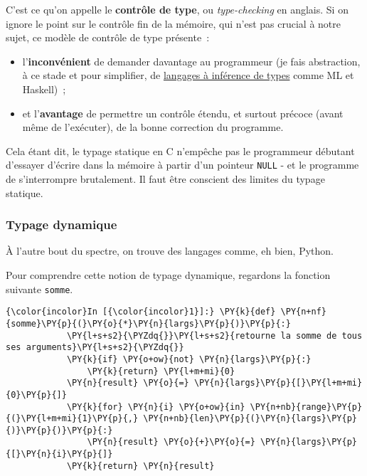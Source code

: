     C'est ce qu'on appelle le \textbf{contrôle de type}, ou
\emph{type-checking} en anglais. Si on ignore le point sur le contrôle
fin de la mémoire, qui n'est pas crucial à notre sujet, ce modèle de
contrôle de type présente~:

\begin{itemize}
\tightlist
\item
  l'\textbf{inconvénient} de demander davantage au programmeur (je fais
  abstraction, à ce stade et pour simplifier, de
  \href{https://en.wikipedia.org/wiki/Type_inference}{langages à
  inférence de types} comme ML et Haskell)~;
\item
  et l'\textbf{avantage} de permettre un contrôle étendu, et surtout
  précoce (avant même de l'exécuter), de la bonne correction du
  programme.
\end{itemize}

    Cela étant dit, le typage statique en C n'empêche pas le programmeur
débutant d'essayer d'écrire dans la mémoire à partir d'un pointeur
\texttt{NULL} - et le programme de s'interrompre brutalement. Il faut
être conscient des limites du typage statique.

    \hypertarget{typage-dynamique}{%
\subsubsection{Typage dynamique}\label{typage-dynamique}}

    À l'autre bout du spectre, on trouve des langages comme, eh bien,
Python.

    Pour comprendre cette notion de typage dynamique, regardons la fonction
suivante \texttt{somme}.

    \begin{Verbatim}[commandchars=\\\{\}]
{\color{incolor}In [{\color{incolor}1}]:} \PY{k}{def} \PY{n+nf}{somme}\PY{p}{(}\PY{o}{*}\PY{n}{largs}\PY{p}{)}\PY{p}{:}
            \PY{l+s+s2}{\PYZdq{}}\PY{l+s+s2}{retourne la somme de tous ses arguments}\PY{l+s+s2}{\PYZdq{}}
            \PY{k}{if} \PY{o+ow}{not} \PY{n}{largs}\PY{p}{:}
                \PY{k}{return} \PY{l+m+mi}{0}
            \PY{n}{result} \PY{o}{=} \PY{n}{largs}\PY{p}{[}\PY{l+m+mi}{0}\PY{p}{]}
            \PY{k}{for} \PY{n}{i} \PY{o+ow}{in} \PY{n+nb}{range}\PY{p}{(}\PY{l+m+mi}{1}\PY{p}{,} \PY{n+nb}{len}\PY{p}{(}\PY{n}{largs}\PY{p}{)}\PY{p}{)}\PY{p}{:}
                \PY{n}{result} \PY{o}{+}\PY{o}{=} \PY{n}{largs}\PY{p}{[}\PY{n}{i}\PY{p}{]}
            \PY{k}{return} \PY{n}{result}
\end{Verbatim}


